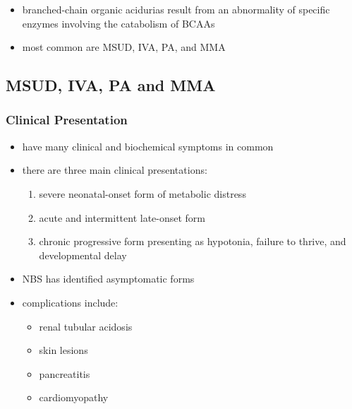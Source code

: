 \documentclass[12pt]{scrartcl}
\begin{document}
\begin{itemize}
\item branched-chain organic acidurias result from an abnormality of
specific enzymes involving the catabolism of BCAAs
\item most common are MSUD, IVA, PA, and MMA
\end{itemize}

\subsection{MSUD, IVA, PA and MMA}
\label{sec:org4f5464b}
\subsubsection{Clinical Presentation}
\label{sec:org8ff2ada}
\begin{itemize}
\item have many clinical and biochemical symptoms in common
\item there are three main clinical presentations:
\begin{enumerate}
\item severe neonatal-onset form of metabolic distress
\item acute and intermittent late-onset form
\item chronic progressive form presenting as hypotonia, failure to
thrive, and developmental delay
\end{enumerate}
\item NBS has identified asymptomatic forms

\item complications include:
\begin{itemize}
\item renal tubular acidosis
\item skin lesions
\item pancreatitis
\item cardiomyopathy
\end{itemize}
\end{itemize}
\end{document}
